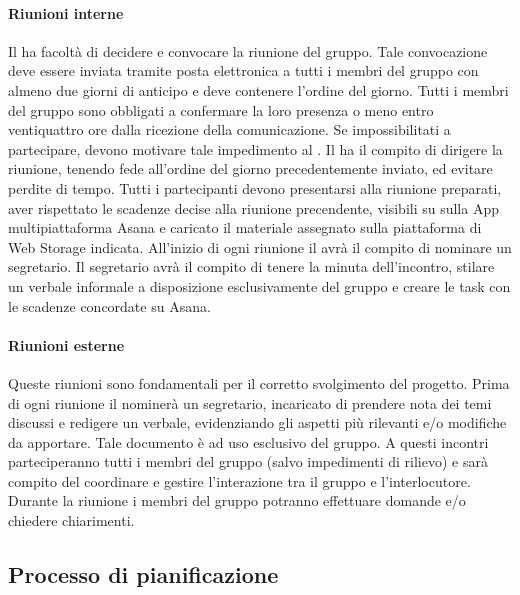 		\paragraph{Riunioni interne}
		Il \textit{\RdP} ha facoltà di decidere e convocare la riunione del gruppo. Tale convocazione deve essere inviata tramite posta elettronica a tutti i membri del gruppo con almeno due giorni di anticipo e deve contenere l’ordine del giorno. Tutti i membri del gruppo sono obbligati a confermare la loro presenza o meno entro ventiquattro ore dalla ricezione della comunicazione. Se impossibilitati a partecipare, devono motivare tale impedimento al \textit{\RdP}. 
		Il \textit{\RdP} ha il compito di dirigere la riunione, tenendo fede all’ordine del giorno precedentemente inviato, ed evitare perdite di tempo. 
		Tutti i partecipanti devono presentarsi alla riunione preparati, aver rispettato le scadenze decise alla riunione precendente, visibili su sulla App multipiattaforma Asana e caricato il materiale assegnato sulla piattaforma di Web Storage indicata.
		All’inizio di ogni riunione il \textit{\RdP} avrà il compito di nominare un segretario. Il segretario avrà il compito di tenere la minuta dell’incontro, stilare un verbale informale a disposizione esclusivamente del gruppo e creare le task con le scadenze concordate su Asana.  
		
		\paragraph{Riunioni esterne}
		Queste riunioni sono fondamentali per il corretto svolgimento del progetto. Prima di ogni riunione il \textit{\RdP} nominerà un segretario, incaricato di prendere nota dei temi discussi e redigere un verbale, evidenziando gli aspetti più rilevanti e/o modifiche da apportare. Tale documento è ad uso esclusivo del gruppo.
		A questi incontri parteciperanno tutti i membri del gruppo (salvo impedimenti di rilievo) e sarà compito del \textit{\RdP} coordinare e gestire l’interazione tra il gruppo e l’interlocutore. Durante la riunione i membri del gruppo potranno effettuare domande e/o chiedere chiarimenti. 





\subsection{Processo di pianificazione}

